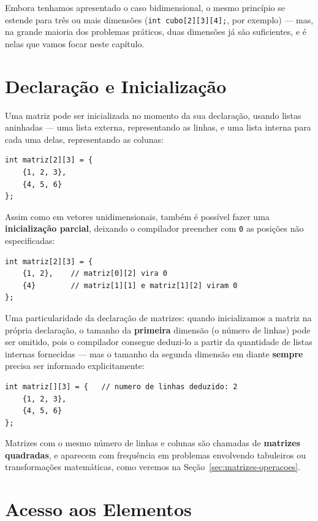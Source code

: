 \documentclass[12pt,a4paper,oneside]{extreport}
\begin{document}
Embora tenhamos apresentado o caso bidimensional, o mesmo princípio se estende para três ou mais dimensões (\texttt{int cubo[2][3][4];}, por exemplo) — mas, na grande maioria dos problemas práticos, duas dimensões já são suficientes, e é nelas que vamos focar neste capítulo.

\section{Declaração e Inicialização}

Uma matriz pode ser inicializada no momento da sua declaração, usando listas aninhadas — uma lista externa, representando as linhas, e uma lista interna para cada uma delas, representando as colunas:

\begin{lstlisting}
int matriz[2][3] = {
    {1, 2, 3},
    {4, 5, 6}
};
\end{lstlisting}

Assim como em vetores unidimensionais, também é possível fazer uma \textbf{inicialização parcial}, deixando o compilador preencher com \texttt{0} as posições não especificadas:

\begin{lstlisting}
int matriz[2][3] = {
    {1, 2},    // matriz[0][2] vira 0
    {4}        // matriz[1][1] e matriz[1][2] viram 0
};
\end{lstlisting}

Uma particularidade da declaração de matrizes: quando inicializamos a matriz na própria declaração, o tamanho da \textbf{primeira} dimensão (o número de linhas) pode ser omitido, pois o compilador consegue deduzi-lo a partir da quantidade de listas internas fornecidas — mas o tamanho da segunda dimensão em diante \textbf{sempre} precisa ser informado explicitamente:

\begin{lstlisting}
int matriz[][3] = {   // numero de linhas deduzido: 2
    {1, 2, 3},
    {4, 5, 6}
};
\end{lstlisting}

Matrizes com o mesmo número de linhas e colunas são chamadas de \textbf{matrizes quadradas}, e aparecem com frequência em problemas envolvendo tabuleiros ou transformações matemáticas, como veremos na Seção~\ref{sec:matrizes-operacoes}.

\section{Acesso aos Elementos}
\end{document}
